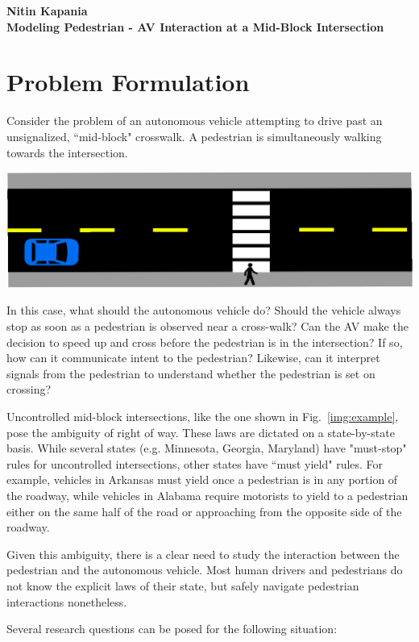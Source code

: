 \documentclass[11pt]{article}
\begin{document}
\textbf{Nitin Kapania} \\
\textbf{Modeling Pedestrian - AV Interaction at a Mid-Block Intersection} \\ 

\section{Problem Formulation}
Consider the problem of an autonomous vehicle attempting to drive past an unsignalized, ``mid-block" crosswalk. A pedestrian is simultaneously walking towards the intersection. 

\begin{center}
   \includegraphics[width=.8\textwidth]{Images/example.eps}
   \label{img:example}
\end{center}

In this case, what should the autonomous vehicle do? Should the vehicle always stop as soon as a pedestrian is observed near a cross-walk? Can the AV make the decision to speed up and cross before the pedestrian is in the intersection? If so, how can it communicate intent to the pedestrian? Likewise, can it interpret signals from the pedestrian to understand whether the pedestrian is set on crossing? 

Uncontrolled mid-block intersections, like the one shown in Fig.~\ref{img:example}, pose the ambiguity of right of way. These laws are dictated on a state-by-state basis. While several states (e.g. Minnesota, Georgia, Maryland) have "must-stop" rules for uncontrolled intersections, other states have ``must yield" rules. For example, vehicles in Arkansas must yield once a pedestrian is in any portion of the roadway, while vehicles in Alabama require motorists to yield to a pedestrian either on the same half of the road or approaching from the opposite side of the roadway. 

Given this ambiguity, there is a clear need to study the interaction between the pedestrian and the autonomous vehicle. Most human drivers and pedestrians do not know the explicit laws of their state, but safely navigate pedestrian interactions nonetheless. 

Several research questions can be posed for the following situation:
\end{document}
